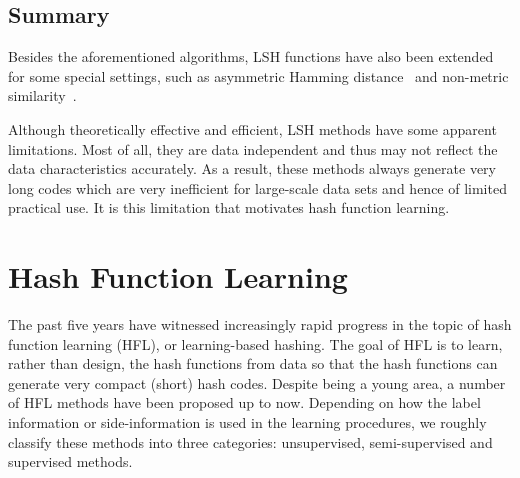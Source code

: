 \subsection{Summary}

Besides the aforementioned algorithms, \mbox{LSH} functions have also been extended for some special settings, such as asymmetric Hamming distance~\cite{dong2008sigir,gordo2011cvpr} and non-metric similarity~\cite{athitsos2008icde,mu2010aaai}.

Although theoretically effective and efficient, \mbox{LSH} methods have some apparent limitations. Most of all, they are data independent and thus may not reflect the data characteristics accurately. As a result, these methods always generate very long codes which are very inefficient for large-scale data sets and hence of limited practical use. It is this limitation that motivates hash function learning.




\section{Hash Function Learning}
\label{background:hfl}

The past five years have witnessed increasingly rapid progress in the topic of hash function learning (\mbox{HFL}), or learning-based hashing. The goal of \mbox{HFL} is to learn, rather than design, the hash functions from data so that the hash functions can generate very compact (short) hash codes. Despite being a young area, a number of \mbox{HFL} methods have been proposed up to now. Depending on how the label information or side-information is used in the learning procedures, we roughly classify these methods into three categories: unsupervised, semi-supervised and supervised methods. 

